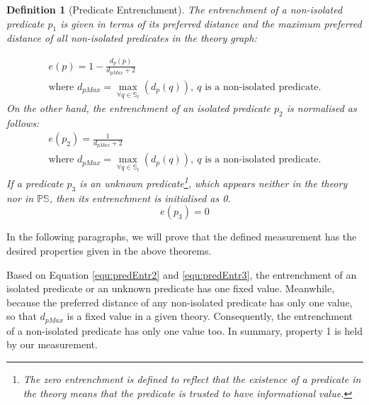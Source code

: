 \documentclass[11pt,letterpaper]{article}
\newtheorem{defn}{Definition}[section]
\newcommand{\ps}{\mathbb{PS}}
\begin{document}
\begin{defn}[Predicate Entrenchment]\label{def:predEn}
The entrenchment of a non-isolated predicate $p_{1}$ is given in terms of its preferred distance and the maximum preferred distance of all non-isolated predicates in the theory graph:

\begin{equation}\label{equ:predEntr1}
\begin{multlined}
    e(p) =1- \frac{d_{p}(p)}{d_{pMax}+2} \\
 \text{where } d_{pMax} = \max_{\forall q \in \mathbb{S}_t}(d_{p}(q)),\  q \text{ is a non-isolated predicate}.
\end{multlined}
\end{equation} 
On the other hand, the entrenchment of an isolated predicate $p_{2}$ is normalised as follows:
\begin{equation}\label{equ:predEntr2}
\begin{multlined}
    e(p_{2}) =\frac{1}{d_{pMax}+2} \\
 \text{where } d_{pMax} = \max_{\forall q \in \mathbb{S}_t}(d_{p}(q)),\  q \text{ is a non-isolated predicate}.
\end{multlined}
\end{equation}
If a predicate $p_{3}$ is an unknown predicate\footnote{The zero entrenchment is defined to reflect that the existence of a predicate in the theory means that the predicate is trusted to have informational value.}, which appears neither in the theory nor in $\ps$, then its entrenchment is initialised as 0.
\begin{equation}\label{equ:predEntr3}
    e(p_{3}) =0
\end{equation}
\end{defn}
In the following paragraphs, we will prove that the defined measurement has the desired properties given in the above theorems.

Based on Equation \ref{equ:predEntr2} and \ref{equ:predEntr3}, the entrenchment of an isolated predicate or an unknown predicate has one fixed value. Meanwhile, because the preferred distance of any non-isolated predicate has only one value, so that $d_{pMax}$ is a fixed value in a given theory. Consequently, the entrenchment of a non-isolated predicate has only one value too. In summary, property 1 is held by our measurement.
\end{document}
